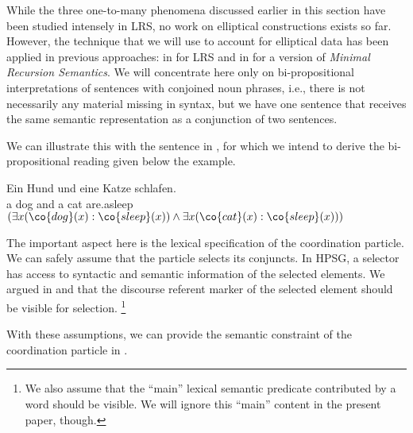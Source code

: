 \documentclass[output=paper]{langsci/langscibook}
\begin{document}
%

While the three one-to-many phenomena discussed earlier in this section have been studied intensely in LRS, no work on elliptical constructions exists so far.
However, the technique that we will use to account for elliptical data has been applied in previous approaches: in \citet{Sailer:05.hpsg} for LRS and in \citet{Bonami:Godard:07} for a version of \emph{Minimal Recursion Semantics}.
We will concentrate here only on bi-propositional interpretations of sentences with conjoined noun phrases, i.e., there is not necessarily any material missing in syntax, but we have one sentence that receives the same semantic representation as a conjunction of two sentences.

We can illustrate this with the sentence in , for which we intend to derive the bi-propositional reading given below the example.

\ea \label{hund-katze-schlaf}
\gll Ein Hund und eine Katze schlafen.\\
a dog and a cat are.asleep\\
\glt $(\exists x (\co{dog}(x) : \co{sleep}(x)) \land \exists x (\co{cat}(x) : \co{sleep}(x)))$
\z 

The important aspect here is the lexical specification of the coordination particle. 
We can safely assume that the particle selects its conjuncts. In HPSG, a selector has access to syntactic and semantic information of the selected elements. 
We argued in \citet{Richter:Sailer:04} and \citet{Sailer:04.cssp} that the discourse referent marker of the selected element should be visible for selection.%
\footnote{\label{fn-main}
We also assume that the ``main'' lexical semantic predicate contributed by a word should be visible. We will ignore this ``main'' content in the present paper, though.}

With these assumptions, we can provide the semantic constraint of the 
coordination particle  in . 
\end{document}
